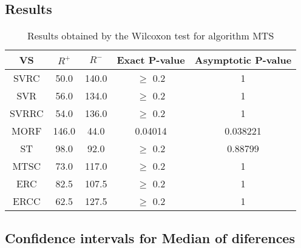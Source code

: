 \documentclass[a4paper,10pt]{article}
\begin{document}
\subsection{Results}

\begin{table}[!htp]
\centering\small
\begin{tabular}{
|c|c|c|c|c|}
\hline
 VS & $R^{+}$ & $R^{-}$ & Exact P-value & Asymptotic P-value \\ \hline 
SVRC & 50.0 & 140.0 & $\geq$ 0.2 & 1\\ \hline 
SVR & 56.0 & 134.0 & $\geq$ 0.2 & 1\\ \hline 
SVRRC & 54.0 & 136.0 & $\geq$ 0.2 & 1\\ \hline 
MORF & 146.0 & 44.0 & 0.04014 & 0.038221\\ \hline 
ST & 98.0 & 92.0 & $\geq$ 0.2 & 0.88799\\ \hline 
MTSC & 73.0 & 117.0 & $\geq$ 0.2 & 1\\ \hline 
ERC & 82.5 & 107.5 & $\geq$ 0.2 & 1\\ \hline 
ERCC & 62.5 & 127.5 & $\geq$ 0.2 & 1\\ \hline 

\end{tabular}
\caption{Results obtained by the Wilcoxon test for algorithm MTS}
\end{table}

\subsection{Confidence intervals for Median of diferences}
\end{document}
